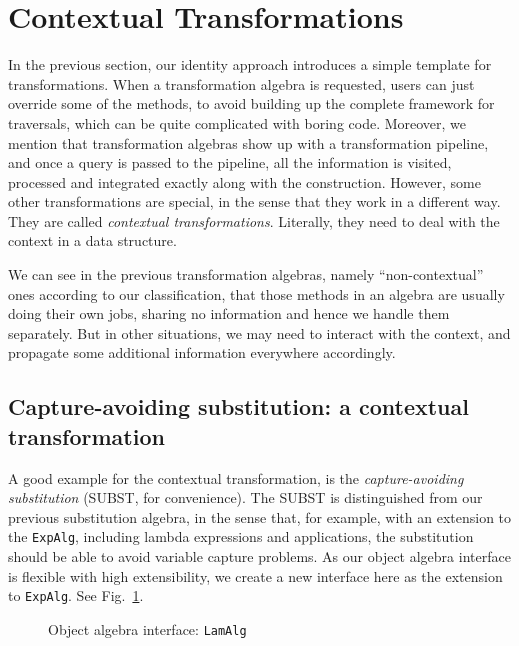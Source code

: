 \section{Contextual Transformations}\label{sec:contexttrans}

In the previous section, our identity approach introduces a simple template for transformations. When a transformation algebra is requested, users can just override some of the methods, to avoid building up the complete framework for traversals, which can be quite complicated with boring code. Moreover, we mention that transformation algebras show up with a transformation pipeline, and once a query is passed to the pipeline, all the information is visited, processed and integrated exactly along with the construction. However, some other transformations are special, in the sense that they work in a different way. They are called \textit{contextual transformations}. Literally, they need to deal with the context in a data structure.

We can see in the previous transformation algebras, namely ``non-contextual'' ones according to our classification, that those methods in an algebra are usually doing their own jobs, sharing no information and hence we handle them separately. But in other situations, we may need to interact with the context, and propagate some additional information everywhere accordingly.

\subsection{Capture-avoiding substitution: a contextual transformation}\label{subsec:captureavoidsubst}

A good example for the contextual transformation, is the \textit{capture-avoiding substitution} (SUBST, for convenience).  The SUBST is distinguished from our previous substitution algebra, in the sense that, for example, with an extension to the \lstinline{ExpAlg}, including lambda expressions and applications, the substitution should be able to avoid variable capture problems. As our object algebra interface is flexible with high extensibility, we create a new interface here as the extension to \lstinline{ExpAlg}. See Fig.~\ref{lam_alg}.

\begin{figure}[!htbp]
\vspace{-.1in}
\caption{Object algebra interface: \lstinline{LamAlg}}
\label{lam_alg}
\end{figure}

